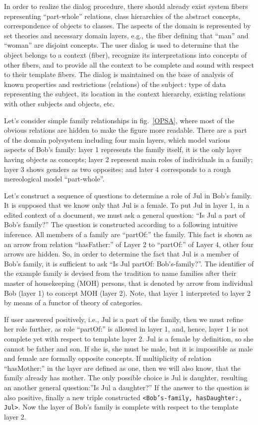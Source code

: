 \documentclass[conference]{IEEEtran}
\begin{document}
In order to realize the dialog procedure, there should already exist
system fibers representing ``part-whole'' relations, class hierarchies
of the abstract concepts, correspondence of objects to classes.  The
aspects of the domain is represented by set theories and necessary
domain layers, e.g., the fiber defining that ``man'' and ``woman'' are
disjoint concepts.  The user dialog is used to determine that the
object belongs to a context (fiber), recognize its interpretations
into concepts of other fibers, and to provide all the context to be
complete and sound with respect to their template fibers.  The dialog
is maintained on the base of analysis of known properties and
restrictions (relations) of the subject\,: type of data representing
the subject, its location in the context hierarchy, existing relations
with other subjects and objects, etc.

Let's consider simple family relationships in fig.~\ref{OPSA}, where
most of the obvious relations are hidden to make the figure more
readable.  There are a part of the domain polysystem including four
main layers, which model various aspects of Bob's family: layer 1
represents the family itself, it is the only layer having objects as
concepts; layer 2 represent main roles of individuals in a family;
layer 3 shows genders as two opposites; and later 4 corresponds to
a rough mereological model ``part-whole''.

Let's construct a sequence of questions to determine a role of Jul in
Bob's family.  It is supposed that we know only that Jul is a female.
To put Jul in layer 1, in a edited context of a document, we must ask
a general question: ``Is Jul a part of Bob's family?''  The question
is constructed according to a following intuitive inference.  All
members of a family are ``partOf:'' the family.  This fact is shown as
an arrow from relation ``hasFather:'' of Layer 2 to ``partOf:'' of Layer
4, other four arrows are hidden.  So, in order to determine the fact
that Jul is a member of Bob's family, it is sufficient to ask ``Is Jul
partOf: Bob's-family?''.  The identifier of the example family is
devised from the tradition to name families after their master of
housekeeping (MOH) persons, that is denoted by arrow from individual
Bob (layer 1) to concept MOH (layer 2).  Note, that layer 1
interpreted to layer 2 by means of a functor of theory of categories.

If user answered positively, i.e., Jul is a part of the family, then
we must refine her role further, as role ``partOf:'' is allowed in
layer 1, and, hence, layer 1 is not complete yet with respect to
template layer 2.  Jul is a female by definition, so she cannot be
father and son.  If she is, she must be male, but it is impossible as
male and female are formally opposite concepts.  If multiplicity of
relation ``hasMother:'' in the layer are defined as one, then we will
also know, that the family already has mother.  The only possible
choice is Jul is daughter, resulting an another general question:''Is
Jul a daughter?''  If the answer to the question is also positive,
finally a new triple constructed \texttt{<Bob's-family, hasDaughter:,
  Jul>}.  Now the layer of Bob's family is complete with respect to
the template layer 2.
\end{document}

